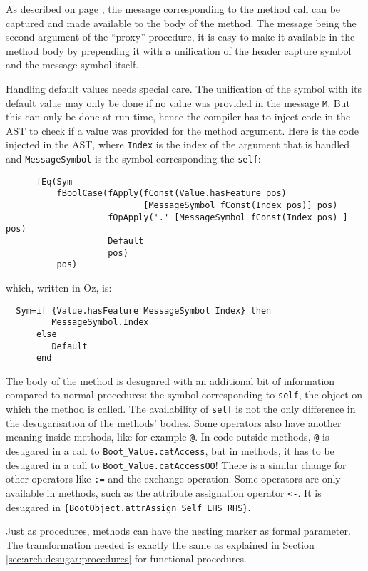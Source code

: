 \documentclass[a4paper]{memoir}
\begin{document}
As described on page \pageref{compilerinput:classes:headcapture}, the message
corresponding to the method call can be captured and made available to the body of the
method. The message being the second argument of the ``proxy'' procedure, it is
easy to make it available in the method body by prepending it with a unification
of the header capture symbol and the message symbol itself.

Handling default values needs special care. The unification of the symbol with its default value may only be done
if no value was provided in the message \lstinline!M!. But this can only be done at run time, hence the compiler
has to inject code in the AST to check if a value was provided for the method argument.
Here is the code injected in the AST, where \lstinline!Index! is the index of the argument that is handled and 
\lstinline!MessageSymbol! is the symbol corresponding the \lstinline!self!:
\begin{lstlisting}
      fEq(Sym 
          fBoolCase(fApply(fConst(Value.hasFeature pos) 
                           [MessageSymbol fConst(Index pos)] pos)
                    fOpApply('.' [MessageSymbol fConst(Index pos) ] pos)
                    Default 
                    pos) 
          pos)
\end{lstlisting}
which, written in Oz, is:
\begin{lstlisting}
  Sym=if {Value.hasFeature MessageSymbol Index} then 
         MessageSymbol.Index 
      else
         Default
      end
\end{lstlisting}

The body of the method is desugared with an additional bit of information compared to normal procedures: the symbol corresponding to \lstinline!self!, the object on which the method is called. 
The availability of \lstinline!self! is not the only difference in the desugarisation of the methods' bodies. Some operators also have another meaning inside methods, like for example \lstinline!@!.
In code outside methods, \lstinline!@! is desugared in a call to
\lstinline!Boot_Value.catAccess!, but in methods, it has to be desugared in a
call to \lstinline!Boot_Value.catAccessOO!! There is a similar change for other
operators like \lstinline!:=! and the exchange operation.
Some operators are only available in methods, such as the attribute assignation
operator \lstinline!<-!. It is desugared in 
\lstinline!{BootObject.attrAssign Self LHS RHS}!.

Just as procedures, methods can have the nesting marker as formal parameter. The transformation needed
is exactly the same as explained in Section \ref{sec:arch:desugar:procedures} for functional procedures.
\end{document}
